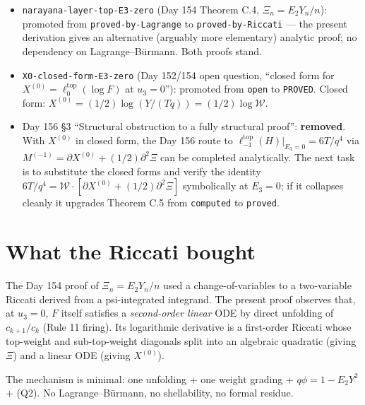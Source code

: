 \documentclass[11pt]{article}
\newcommand{\W}{\mathcal{W}}
\begin{document}
\begin{itemize}
  \item \texttt{narayana-layer-top-E3-zero} (Day 154 Theorem C.4, $\Xi_n = E_2 Y_n/n$): promoted from \texttt{proved-by-Lagrange} to \texttt{proved-by-Riccati} --- the present derivation gives an alternative (arguably more elementary) analytic proof; no dependency on Lagrange--B\"urmann. Both proofs stand.
  \item \texttt{X0-closed-form-E3-zero} (Day 152/154 open question, ``closed form for $X^{(0)} = \ell^{\mathrm{top}}_0(\log F)$ at $u_3=0$''): promoted from \texttt{open} to \texttt{PROVED}. Closed form: $X^{(0)} = (1/2)\log(Y/(Tq)) = (1/2)\log\W$.
  \item Day 156 \S3 ``Structural obstruction to a fully structural proof'': \textbf{removed}. With $X^{(0)}$ in closed form, the Day 156 route to $\ell^{\mathrm{top}}_{-1}(H)|_{E_3=0} = 6T/q^4$ via $M^{(-1)} = \partial X^{(0)} + (1/2)\partial^2 \Xi$ can be completed analytically. The next task is to substitute the closed forms and verify the identity $6T/q^4 = \W \cdot [\partial X^{(0)} + (1/2)\partial^2 \Xi]$ symbolically at $E_3 = 0$; if it collapses cleanly it upgrades Theorem C.5 from \texttt{computed} to \texttt{proved}.
\end{itemize}

\section{What the Riccati bought}

The Day 154 proof of $\Xi_n = E_2 Y_n /n$ used a change-of-variables to a two-variable Riccati derived from a psi-integrated integrand. The present proof observes that, at $u_3 = 0$, $F$ itself satisfies a \emph{second-order linear} ODE by direct unfolding of $c_{k+1}/c_k$ (Rule 11 firing). Its logarithmic derivative is a first-order Riccati whose top-weight and sub-top-weight diagonals split into an algebraic quadratic (giving $\Xi$) and a linear ODE (giving $X^{(0)}$).

The mechanism is minimal: one unfolding + one weight grading + $q\phi = 1 - E_2 Y^2$ + (Q2). No Lagrange--B\"urmann, no shellability, no formal residue.
\end{document}
